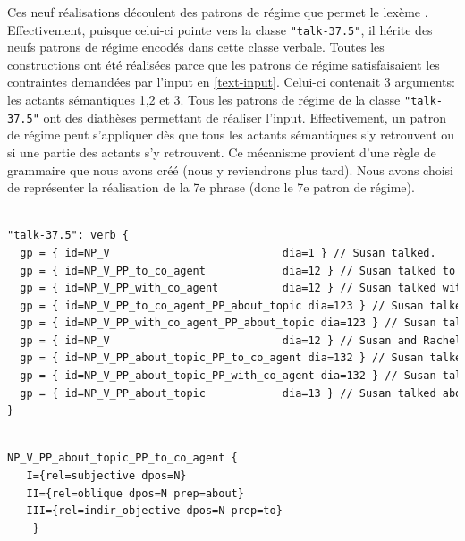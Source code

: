 Ces neuf réalisations découlent des patrons de régime que permet le lexème . Effectivement, puisque celui-ci pointe vers la classe \texttt{"talk-37.5"}, il hérite des neufs patrons de régime encodés dans cette classe verbale. Toutes les constructions ont été réalisées parce que les patrons de régime satisfaisaient les contraintes demandées par l'input en \ref{text-input}. Celui-ci contenait 3 arguments: les actants sémantiques 1,2 et 3. Tous les patrons de régime de la classe \texttt{"talk-37.5"} ont des diathèses permettant de réaliser l'input. Effectivement, un patron de régime peut s'appliquer dès que tous les actants sémantiques s'y retrouvent ou si une partie des actants s'y retrouvent. Ce mécanisme provient d'une règle de grammaire que nous avons créé (nous y reviendrons plus tard). Nous avons choisi de représenter la réalisation de la 7e phrase (donc le 7e patron de régime).

\begin{lstlisting}[language=XML, caption=Traits \emph{gp} de la classe \texttt{talk-37.5}]

"talk-37.5": verb {
  gp = { id=NP_V                           dia=1 } // Susan talked.
  gp = { id=NP_V_PP_to_co_agent            dia=12 } // Susan talked to Rachel.
  gp = { id=NP_V_PP_with_co_agent          dia=12 } // Susan talked with Rachel.
  gp = { id=NP_V_PP_to_co_agent_PP_about_topic dia=123 } // Susan talked to Rachel about the problem.
  gp = { id=NP_V_PP_with_co_agent_PP_about_topic dia=123 } // Susan talked with Rachel about the problem.
  gp = { id=NP_V                           dia=12 } // Susan and Rachel talked.
  gp = { id=NP_V_PP_about_topic_PP_to_co_agent dia=132 } // Susan talked about the problem to Rachel.
  gp = { id=NP_V_PP_about_topic_PP_with_co_agent dia=132 } // Susan talked about the problem with Rachel.
  gp = { id=NP_V_PP_about_topic            dia=13 } // Susan talked about the problems of modern America.
}
\end{lstlisting}

\begin{lstlisting}[language=XML, caption=Informations sur le patron de régime sélectionné, label=gpexemple]

NP_V_PP_about_topic_PP_to_co_agent {
   I={rel=subjective dpos=N}
   II={rel=oblique dpos=N prep=about}
   III={rel=indir_objective dpos=N prep=to}
	}
\end{lstlisting}

